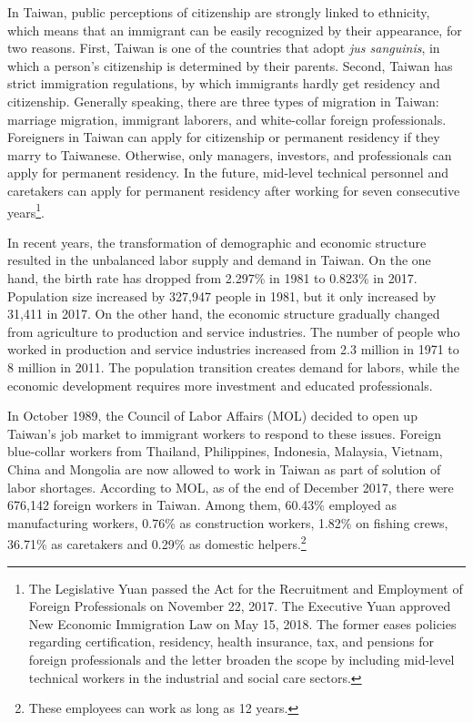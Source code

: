 \documentclass[12pt]{article}
\begin{document}
In Taiwan, public perceptions of citizenship are strongly linked to ethnicity, which means that an immigrant can be easily recognized by their appearance, for two reasons. First, Taiwan is one of the countries that adopt \emph{jus sanguinis}, in which a person's citizenship is determined by their parents. Second, Taiwan has strict immigration regulations, by which immigrants hardly get residency and citizenship. Generally speaking, there are three types of migration in Taiwan: marriage migration, immigrant laborers, and white-collar foreign professionals. Foreigners in Taiwan can apply for citizenship or permanent residency if they marry to Taiwanese. Otherwise, only managers, investors, and professionals can apply for permanent residency. In the future, mid-level technical personnel and caretakers can apply for permanent residency after working for seven consecutive years\footnote{The Legislative Yuan passed the Act for the Recruitment and Employment of Foreign Professionals on November 22, 2017. The Executive Yuan approved New Economic Immigration Law on May 15, 2018. The former eases policies regarding certification, residency, health insurance, tax, and pensions for foreign professionals and the letter broaden the scope by including mid-level technical workers in the industrial and social care sectors.}.


In recent years, the transformation of demographic and economic structure resulted in the unbalanced labor supply and demand in Taiwan. On the one hand, the birth rate has dropped from 2.297\% in 1981 to 0.823\% in 2017. Population size increased by 327,947 people in 1981, but it only increased by 31,411 in 2017. On the other hand, the economic structure gradually changed from agriculture to production and service industries. The number of people who worked in production and service industries increased from 2.3 million in 1971 to 8 million in 2011. The population transition creates demand for labors, while the economic development requires more investment and educated professionals.


In October 1989, the Council of Labor Affairs (MOL) decided to open up Taiwan's job market to immigrant workers to respond to these issues. Foreign blue-collar workers from Thailand, Philippines, Indonesia, Malaysia, Vietnam, China and Mongolia are now allowed to work in Taiwan as part of solution of labor shortages. According to MOL, as of the end of December 2017, there were 676,142 foreign workers in Taiwan. Among them, 60.43\% employed as manufacturing workers, 0.76\% as construction workers, 1.82\% on fishing crews, 36.71\% as caretakers and 0.29\% as domestic helpers.\footnote{These employees can work as long as 12 years.}
\end{document}
